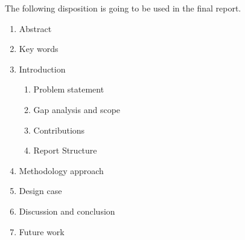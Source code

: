 The following disposition is going to be used in the final report.
\begin{enumerate}[itemsep=0pt, topsep=3pt, partopsep=3pt, label=\Roman*]
  \item Abstract
  \item Key words
  \item Introduction
  \begin{enumerate}[itemsep=0pt, topsep=0pt, partopsep=0pt, label=\roman*]
  \item Problem statement 
  \item Gap analysis and scope
  \item Contributions
  \item Report Structure
  \end{enumerate}
  \item Methodology approach
  \item Design case
  \item Discussion and conclusion
  \item Future work
\end{enumerate}